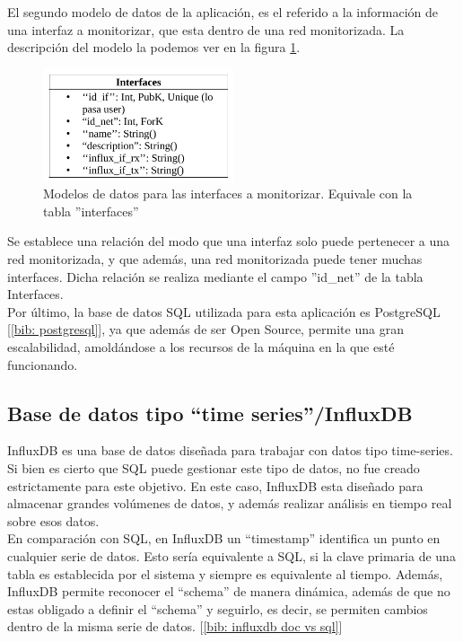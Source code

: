 \documentclass[a4paper, oneside, 12pt]{book}
\begin{document}
	\noindent El segundo modelo de datos de la aplicación, es el referido a la información de una interfaz a monitorizar, que esta dentro de una red monitorizada. La descripción del modelo la podemos ver en la figura \ref{img: modelo sql interfaces}.

	\begin{figure}[h!]
		\begin{center}
			\includegraphics[width=0.5\textwidth]{img/model_sql_interfaces.png}
			\caption{Modelos de datos para las interfaces a monitorizar. Equivale con la tabla ''interfaces''}
			\label{img: modelo sql interfaces}
		\end{center}
	\end{figure}

	\noindent Se establece una relación del modo que una interfaz solo puede pertenecer a una red monitorizada, y que además, una red monitorizada puede tener muchas interfaces. Dicha relación se realiza mediante el campo ''id\_net'' de la tabla Interfaces. \\
	
	\noindent Por último, la base de datos SQL utilizada para esta aplicación es PostgreSQL [\ref{bib: postgresql}], ya que además de ser Open Source, permite una gran escalabilidad, amoldándose a los recursos de la máquina en la que esté funcionando.
	
	\pagebreak
	
	\subsection{Base de datos tipo ``time series''/InfluxDB} 
	
	\noindent InfluxDB es una base de datos diseñada para trabajar con datos tipo time-series. Si bien es cierto que SQL puede gestionar este tipo de datos, no fue creado estrictamente para este objetivo. En este caso, InfluxDB esta diseñado para almacenar grandes volúmenes de datos, y además realizar análisis en tiempo real sobre esos datos. \\
	
	\noindent En comparación con SQL, en InfluxDB un ``timestamp'' identifica un punto en cualquier serie de datos. Esto sería equivalente a SQL, si la clave primaria de una tabla es establecida por el sistema y siempre es equivalente al tiempo. Además, InfluxDB permite reconocer el ``schema'' de manera dinámica, además de que no estas obligado a definir el ``schema'' y seguirlo, es decir, se permiten cambios dentro de la misma serie de datos. [\ref{bib: influxdb doc vs sql}] \\
	
\end{document}
